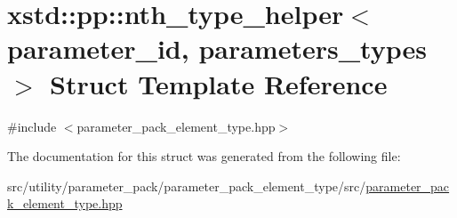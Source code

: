 \hypertarget{structxstd_1_1pp_1_1nth__type__helper}{\section{xstd\-:\-:pp\-:\-:nth\-\_\-type\-\_\-helper$<$ parameter\-\_\-id, parameters\-\_\-types $>$ Struct Template Reference}
\label{structxstd_1_1pp_1_1nth__type__helper}
}


{\ttfamily \#include $<$parameter\-\_\-pack\-\_\-element\-\_\-type.\-hpp$>$}



The documentation for this struct was generated from the following file\-:\begin{DoxyCompactItemize}
\item 
src/utility/parameter\-\_\-pack/parameter\-\_\-pack\-\_\-element\-\_\-type/src/\hyperlink{parameter__pack__element__type_8hpp}{parameter\-\_\-pack\-\_\-element\-\_\-type.\-hpp}\end{DoxyCompactItemize}
